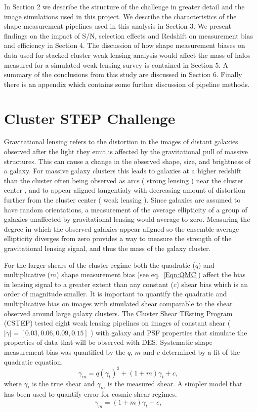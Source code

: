 \documentclass[useAMS,usenatbib]{mn2e}
\begin{document}
\indent
In Section 2 we describe the structure of the challenge in greater detail and the image simulations used in this
project. We describe the characteristics of the shape
measurement pipelines used in this analysis in Section 3. We present
findings on the impact of S/N, selection effects and
Redshift on measurement bias and efficiency in Section 4. The
discussion of how shape measurement biases on data used for stacked cluster weak lensing analysis would affect
the mass of halos measured for a simulated weak lensing
survey is contained in Section 5.  A summary of the conclusions from this study are discussed in
Section 6.  Finally there is an appendix which contains some further
discussion of pipeline methods. 



\section{Cluster STEP Challenge}
Gravitational lensing refers to the distortion in the images of
distant galaxies observed after the light they emit is
affected by the gravitational pull of massive structures. This can
cause a change in the observed shape, size, and brightness of a
galaxy. For massive galaxy clusters this leads to galaxies at a
higher redshift than the cluster often being
observed as arcs ( strong lensing ) near the cluster center , and to
appear aligned tangentialy with decreasing amount of distortion further from
the cluster center ( weak lensing ). Since galaxies are assumed to
have random orientations, a measurement of the average ellipticity of
a group of galaxies unaffected by gravitational lensing would average
to zero. Measuring the degree in which the observed galaxies appear aligned so
the ensemble average ellipticity diverges from zero provides a way to 
measure the strength of the gravitational lensing signal, and thus the
mass of the galaxy cluster. 

\indent For the
larger shears of the cluster regime both the quadratic ($q$) and
multiplicative ($m$) shape measurement bias (see eq.~\ref{Eqn:QMC})
affect the bias in lensing signal to a greater extent than any
constant ($c$) shear bias which is an order of magnitude smaller. It is
important to quantify the quadratic and multiplicative bias on images
with simulated shear comparable to the shear observed around large
galaxy clusters. The Cluster Shear TEsting Program (CSTEP) tested eight weak lensing pipelines on images of constant shear
($|\gamma| = [0.03, 0.06, 0.09, 0.15]$ ) with galaxy and PSF properties that simulate the properties
of data that will be observed with DES. Systematic shape measurement bias was quantified by the $q$, $m$ and $c$
determined by a fit of the quadratic equation.
\begin{equation}\label{Eqn:QMC}
\gamma_m = q (\gamma_t)^2 + (1+m) \gamma_t + c,
\end {equation}
where $\gamma_t$ is the true shear and $\gamma_m$ is the measured
shear. A simpler model that has been used to quantify error
for cosmic shear regimes.
\begin{equation}\label{Eqn:MC}
\gamma_m = (1+m) \gamma_t + c,
\end {equation}
\end{document}
